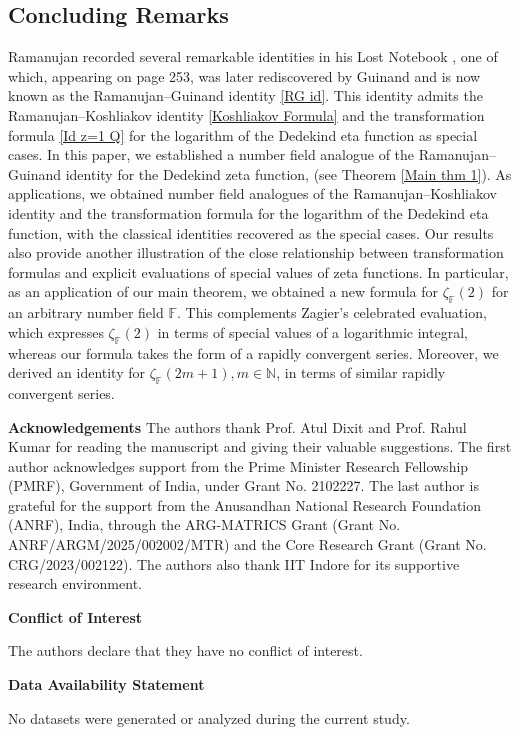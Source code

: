 \documentclass[12pt,reqno]{amsart}
\renewcommand{\(}{\left\(}
\renewcommand{\)}{\right\)}
\renewcommand{\[}{\left\[}
\renewcommand{\]}{\right\]}
\numberwithin{equation}{section}
\theoremstyle{plain}
\begin{document}
\subsection{Concluding Remarks}
Ramanujan recorded several remarkable identities in his Lost Notebook \cite{Ramanujan}, one of which, appearing on page 253, was later rediscovered by Guinand and is now known as the Ramanujan--Guinand identity \eqref{RG id}. This identity admits the Ramanujan--Koshliakov identity \eqref{Koshliakov Formula} and the transformation formula \eqref{Id z=1 Q} for the logarithm of the Dedekind eta function as special cases. In this paper, we established a number field analogue of the Ramanujan--Guinand identity for the Dedekind zeta function, (see Theorem \ref{Main thm 1}). As applications, we obtained number field analogues of the Ramanujan--Koshliakov identity and the transformation formula for the logarithm of the Dedekind eta function, with the classical identities recovered as the special cases. Our results also provide another illustration of the close relationship between transformation formulas and explicit evaluations of special values of zeta functions. In particular, as an application of our main theorem, we obtained a new formula for $\zeta_{\mathbb{F}}(2)$ for an arbitrary number field $\mathbb{F}$. This complements Zagier's celebrated evaluation, which expresses $\zeta_{\mathbb{F}}(2)$ in terms of special values of a logarithmic integral, whereas our formula takes the form of a rapidly convergent series. Moreover, we derived an identity for $\zeta_{\mathbb{F}}(2m+1), m \in \mathbb{N}$, in terms of similar rapidly convergent series.

\textbf{Acknowledgements}
The authors thank Prof. Atul Dixit and Prof. Rahul Kumar for reading the manuscript and giving their valuable suggestions. The first author acknowledges support from the Prime Minister Research Fellowship (PMRF), Government of India, under Grant No. 2102227. The last author is grateful for the support from the Anusandhan National Research Foundation (ANRF), India, through the ARG-MATRICS Grant (Grant No. ANRF/ARGM/2025/002002/MTR) and the Core Research Grant (Grant No. CRG/2023/002122). The authors also thank IIT Indore for its supportive research environment.

\textbf{Conflict of Interest}

The authors declare that they have no conflict of interest.

\textbf{Data Availability Statement}

No datasets were generated or analyzed during the current study.
\end{document}
